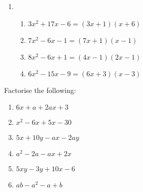 \begin{solutions}{}
{\begin{enumerate}[noitemsep, label=\textbf{\arabic*}. ]
\item %

\begin{enumerate}[noitemsep, label=\textbf{(\alph*)} ] 
\item $3{x}^{2}+17x-6=(3x + 1)(x + 6)$%
\item $7{x}^{2}-6x-1=(7x + 1)(x - 1)$%
\item $8{x}^{2}-6x+1=(4x - 1)(2x - 1)$%
\item $6{x}^{2}-15x-9=(6x + 3)(x - 3)$%
\end{enumerate}

\end{enumerate}}
\end{solutions}

\begin{exercises}{}{

Factorise the following:
\begin{multicols}{2}
\begin{enumerate}[itemsep=5pt, label=\textbf{\arabic*}. ] 
\item $6x+a+2ax+3$
\item ${x}^{2}-6x+5x-30$
\item $5x+10y-ax-2ay$
\item ${a}^{2}-2a-ax+2x$
\item $5xy-3y+10x-6$
\item $ab - a^{2} - a + b$
\end{enumerate}
\end{multicols}

}
\end{exercises}

